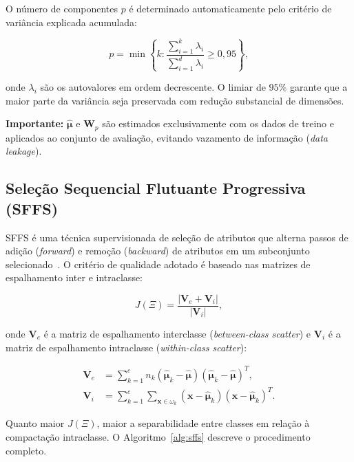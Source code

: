 \documentclass[12pt, a4paper]{article}
\newcommand{\bx}{\mathbf{x}}
\newcommand{\bmu}{\boldsymbol{\mu}}
\newcommand{\bW}{\mathbf{W}}
\begin{document}
O número de componentes $p$ é determinado automaticamente pelo critério de variância explicada acumulada:

\begin{equation}
    p = \min \left\{ k : \frac{\sum_{i=1}^{k} \lambda_i}{\sum_{i=1}^{d} \lambda_i} \geq 0{,}95 \right\},
    \label{eq:pca_var}
\end{equation}

\noindent onde $\lambda_i$ são os autovalores em ordem decrescente. O limiar de $95\%$ garante que a maior parte da variância seja preservada com redução substancial de dimensões.

\textbf{Importante:} $\hat{\bmu}$ e $\bW_p$ são estimados exclusivamente com os dados de treino e aplicados ao conjunto de avaliação, evitando vazamento de informação (\emph{data leakage}).

\subsection{Seleção Sequencial Flutuante Progressiva (SFFS)}
\label{sec:sffs}

SFFS é uma técnica supervisionada de seleção de atributos que alterna passos de adição (\emph{forward}) e remoção (\emph{backward}) de atributos em um subconjunto selecionado~\cite{theodoridis2008}. O critério de qualidade adotado é baseado nas matrizes de espalhamento inter e intraclasse:

\begin{equation}
    J(\Xi) = \frac{|\mathbf{V}_e + \mathbf{V}_i|}{|\mathbf{V}_i|},
    \label{eq:sffs_J}
\end{equation}

\noindent onde $\mathbf{V}_e$ é a matriz de espalhamento interclasse (\emph{between-class scatter}) e $\mathbf{V}_i$ é a matriz de espalhamento intraclasse (\emph{within-class scatter}):

\begin{align}
    \mathbf{V}_e &= \sum_{k=1}^{c} n_k (\hat{\bmu}_k - \hat{\bmu})(\hat{\bmu}_k - \hat{\bmu})^T, \label{eq:Ve} \\
    \mathbf{V}_i &= \sum_{k=1}^{c} \sum_{\bx \in \omega_k} (\bx - \hat{\bmu}_k)(\bx - \hat{\bmu}_k)^T. \label{eq:Vi}
\end{align}

Quanto maior $J(\Xi)$, maior a separabilidade entre classes em relação à compactação intraclasse. O Algoritmo~\ref{alg:sffs} descreve o procedimento completo.
\end{document}
